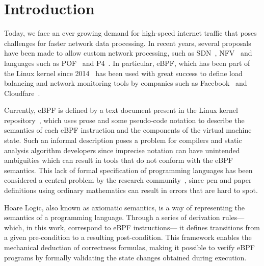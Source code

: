 \documentclass[sigconf]{acmart}
\begin{document}

\frenchspacing
\maketitle


\section{Introduction} %

Today, we face an ever growing demand for high-speed internet traffic that poses challenges for faster network data processing. 
In recent years, several proposals have been made to allow custom network processing, such as SDN~\cite{Feamster14}, NFV~\cite{Mijumbi2016} and languages such as POF~\cite{Song13} and P4~\cite{Bosshart2014}. 
In particular, eBPF, which has been part of the Linux kernel since 2014~\cite{santos2019fast} has been used with great success to define load balancing and network monitoring tools by companies such as Facebook~\cite{Katran} and Cloudfare~\cite{bertin2017}.  

Currently, eBPF is defined by a text document present in the Linux kernel repository~\cite{schulist2025bpf}, which uses prose and some pseudo-code notation to describe the semantics of each eBPF instruction and the components of the virtual machine state. 
Such an informal description poses a problem for compilers and static analysis algorithm developers since imprecise notation can have unintended ambiguities which can result in tools that do not conform with the eBPF semantics. 
This lack of formal specification of programming languages has been considered a central problem by the research community~\cite{Aydemir08}, since pen and paper definitions using ordinary mathematics can result in errors that are hard to spot.

Hoare Logic\cite{hoare1969axiomatic}, also known as axiomatic semantics, is a way of representing the semantics of a programming language. Through a series of derivation rules—which, in this work, correspond to eBPF instructions— it defines transitions from a given pre-condition to a resulting post-condition. This framework enables the mechanical deduction of correctness formulas, making it possible to verify eBPF programs by formally validating the state changes obtained during execution.
\end{document}
